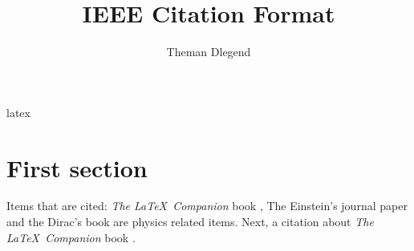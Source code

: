 latex\documentclass{article}
\title{IEEE Citation Format}
\author{Theman Dlegend}
\begin{document}
\maketitle

\section{First section}

Items that are cited: \textit{The \LaTeX\ Companion} book \cite{latexcompanion}, The Einstein's journal paper \cite{einstein} and the Dirac's book \cite{dirac} are physics related items. Next, a citation about \textit{The \LaTeX\ Companion} book \cite{latexcompanion}.

\medskip


\end{document}
